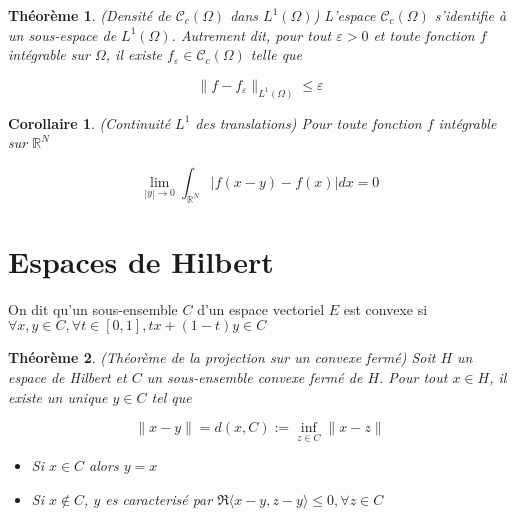 \documentclass[10pt,a4paper,oneside]{article}
\newtheorem{theoreme}{Théorème}
\newtheorem{corollaire}{Corollaire}
\newenvironment{definition}[1][Definition]{\begin{trivlist}
\item[\hskip \labelsep {\bfseries #1}]}{\end{trivlist}}
\begin{document}
\begin{theoreme}
(Densité de $\mathcal{C}_c(\Omega)$ dans $L^1(\Omega)$)
L'espace $\mathcal{C}_c(\Omega)$ s'identifie à un sous-espace de $L^1(\Omega)$. Autrement dit, pour tout $\varepsilon > 0$ et toute fonction $f$ intégrable sur $\Omega$, il existe $f_\varepsilon \in \mathcal{C}_c(\Omega)$ telle que

\[ \| f - f_\varepsilon \|_{L^1(\Omega)} \leq \varepsilon \]
\end{theoreme}

\begin{corollaire}
(Continuité $L^1$ des translations)
Pour toute fonction $f$ intégrable sur $\mathbb{R}^N$

\[ \lim_{|y| \to 0} \int_{\mathbb{R}^N} |f(x - y) - f(x)| dx = 0 \]
\end{corollaire}

\section{Espaces de Hilbert}

\begin{definition}
On dit qu'un sous-ensemble $C$ d'un espace vectoriel $E$ est convexe si
$\forall x,y \in C, \forall t \in [0,1], tx + (1 - t)y \in C$
\end{definition}

\begin{theoreme}
(Théorème de la projection sur un convexe fermé) Soit $H$ un espace de Hilbert et $C$ un sous-ensemble convexe fermé de $H$. Pour tout $x \in H$, il existe un unique $y \in C$ tel que

\[
\| x - y \| = d(x,C) := \inf_{z \in C} \| x - z \|
\]

\begin{itemize}

\item
Si $x \in C$ alors $y = x$

\item
Si $x \not\in C$, $y$ es caracterisé par $\Re \langle x - y,z - y \rangle \leq 0, \forall z \in C$

\end{itemize}

\end{theoreme}
\end{document}
